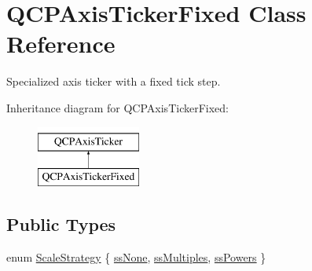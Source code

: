 \hypertarget{class_q_c_p_axis_ticker_fixed}{}\section{Q\+C\+P\+Axis\+Ticker\+Fixed Class Reference}
\label{class_q_c_p_axis_ticker_fixed}


Specialized axis ticker with a fixed tick step.  


Inheritance diagram for Q\+C\+P\+Axis\+Ticker\+Fixed\+:\begin{figure}[H]
\begin{center}
\leavevmode
\includegraphics[height=2.000000cm]{class_q_c_p_axis_ticker_fixed}
\end{center}
\end{figure}
\subsection*{Public Types}
\begin{DoxyCompactItemize}
\item 
enum \hyperlink{class_q_c_p_axis_ticker_fixed_a15b3d38b935d404b1311eb85cfb6a439}{Scale\+Strategy} \{ \hyperlink{class_q_c_p_axis_ticker_fixed_a15b3d38b935d404b1311eb85cfb6a439a6621275677a05caa0de204ae3956b85f}{ss\+None}, 
\hyperlink{class_q_c_p_axis_ticker_fixed_a15b3d38b935d404b1311eb85cfb6a439a22f651785f6412645837421896561104}{ss\+Multiples}, 
\hyperlink{class_q_c_p_axis_ticker_fixed_a15b3d38b935d404b1311eb85cfb6a439ac39d5813e9165ebd494307ae61ce5dce}{ss\+Powers}
 \}
\end{DoxyCompactItemize}
